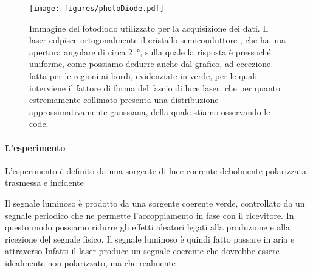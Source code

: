 \documentclass[prb,showpacs,floatfix,altaffilletter,amsmath,amssymb,reprint,citeautoscript]{revtex4-1}
\begin{document}
\begin{figure}
    \centering
    \texttt{[image: figures/photoDiode.pdf]}
    \caption{Immagine del fotodiodo utilizzato per la acquisizione dei dati. Il laser colpisce ortogonalmente il cristallo semiconduttore , che ha una apertura angolare di circa \SI{2}{\degree}, sulla quale la risposta è pressoché uniforme, come possiamo dedurre anche dal grafico, ad eccezione fatta per le regioni ai bordi, evidenziate in verde, per le quali interviene il fattore di forma del fascio di luce laser, che per quanto estremamente collimato presenta una distribuzione approssimativamente gaussiana, della quale stiamo osservando le code.}
    \label{fig:photo-diode}
\end{figure}







\iffalse

\paragraph*{L'esperimento} 
L'esperimento è definito da una sorgente di luce coerente debolmente polarizzata, trasmessa e incidente 

Il segnale luminoso è prodotto da una sorgente coerente  verde, controllato da un segnale periodico che ne permette l'accoppiamento in fase con il ricevitore. In questo modo possiamo ridurre gli effetti aleatori legati alla produzione e alla ricezione del segnale fisico. Il segnale luminoso è quindi fatto passare in aria e attraverso  Infatti il laser produce un segnale coerente che dovrebbe essere idealmente non polarizzato, ma che realmente  
\end{document}
